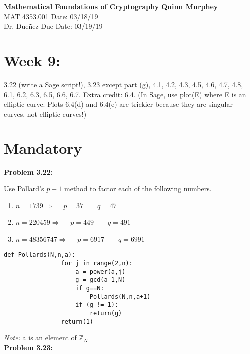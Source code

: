 \documentclass[a4paper, 11pt]{article}
\begin{document}
\noindent
\large\textbf{Mathematical Foundations of Cryptography} \hfill \textbf{Quinn Murphey} \\
\normalsize MAT 4353.001 \hfill Date: 03/18/19 \\
Dr. Dueñez \hfill Due Date: 03/19/19 \\
\noindent\makebox[\linewidth]{\rule{\paperwidth}{0.4pt}}
\section*{Week 9:}
    3.22 (write a Sage script!), 3.23 except part (g), 4.1, 4.2, 4.3, 4.5, 4.6, 4.7, 4.8, 6.1, 6.2, 6.3, 6.5, 6.6, 6.7.
    Extra credit: 6.4. (In Sage, use plot(E) where E is an elliptic curve.  Plots 6.4(d) and 6.4(e) are trickier because they are singular curves, not elliptic curves!)
    
\section*{Mandatory}

\noindent\textbf{Problem 3.22:}
    
    Use Pollard's $p-1$ method to factor each of the following numbers.
    \begin{enumerate}[label=(\alph*)]
        \item $n=1739\Rightarrow \quad$
        $p = 37 \qquad q = 47$
        \item $n=220459\Rightarrow \quad$
        $p = 449 \qquad q = 491$
        \item $n = 48356747 \Rightarrow \quad$
        $p = 6917 \qquad q = 6991$
    \end{enumerate}
            \begin{lstlisting}[style = Python]
                def Pollards(N,n,a):
                for j in range(2,n):
                    a = power(a,j)
                    g = gcd(a-1,N)
                    if g==N:
                        Pollards(N,n,a+1)
                    if (g != 1):
                        return(g)
                return(1)
        \end{lstlisting}
    \textit{Note:} a is an element of $\mathbb{Z}_N$\\
    
\noindent\textbf{Problem 3.23:}
    
\end{document}

